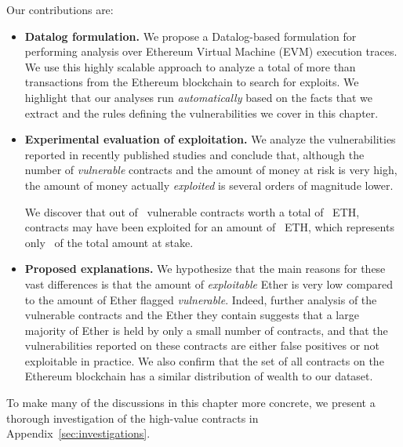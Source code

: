  Our contributions are:\itemsep=0pt
\begin{itemize}\itemsep=-2pt
\item \textbf{Datalog formulation.}
    We propose a Datalog-based formulation for performing analysis over Ethereum Virtual Machine (EVM) execution traces. We use this highly scalable approach to analyze a total of more than~ transactions from the Ethereum blockchain to search for exploits. We highlight that our analyses run \emph{automatically} based on the facts that we extract and the rules defining the vulnerabilities we cover in this chapter.

\item \textbf{Experimental evaluation of exploitation.}
    We analyze the vulnerabilities reported in \PapersAnalyzed recently published studies and conclude that, although the number of \emph{vulnerable} contracts and the amount of money at risk is very high, the amount of money actually \emph{exploited} is several orders of magnitude lower.

    We discover that out of~\empirical{\VulnerableContracts} vulnerable contracts worth a total of~\empirical{\EtherStake} ETH,~\empirical{\NumExploitedContracts} contracts may have been exploited for an amount of~\empirical{\ExploitedEther} ETH, which represents only~\empirical{\PercentExploitedEther} of the total amount at stake.

\item \textbf{Proposed explanations.}
    We hypothesize that the main reasons for these vast differences is that the amount of \emph{exploitable} Ether is very low compared to the amount of Ether flagged \emph{vulnerable}.
    Indeed, further analysis of the vulnerable contracts and the Ether they contain suggests that a large majority of Ether is held by only a small number of contracts, and that the vulnerabilities reported on these contracts are either false positives or not exploitable in practice. We also confirm that the set of all contracts on the Ethereum blockchain has a similar distribution of wealth to our dataset.
\end{itemize}
To make many of the discussions in this chapter more concrete, we present a thorough investigation of the high-value contracts in Appendix~\ref{sec:investigations}. 

